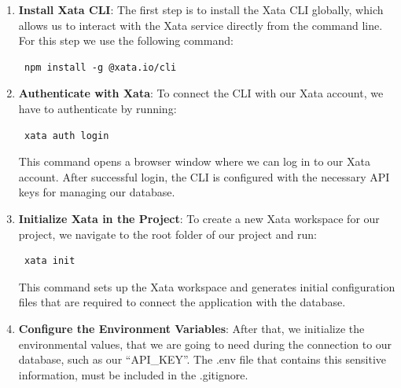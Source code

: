 \begin{enumerate}
    \item \textbf{Install Xata CLI}: The first step is to install the Xata CLI globally, which allows us to interact with the Xata service directly from the command line. For this step we use the following command:
    \begin{verbatim} npm install -g @xata.io/cli \end{verbatim}
    \item \textbf{Authenticate with Xata}: To connect the CLI with our Xata account, we have to authenticate by running: \begin{verbatim} xata auth login \end{verbatim}
    This command opens a browser window where we can log in to our Xata account. After successful login, the CLI is configured with the necessary API keys for managing our database.
    \item \textbf{Initialize Xata in the Project}: To create a new Xata workspace for our project, we navigate to the root folder of our project and run: \begin{verbatim} xata init \end{verbatim}
    This command sets up the Xata workspace and generates initial configuration files that are required to connect the application with the database.
    \item \textbf{Configure the Environment Variables}:  After that, we initialize the environmental values, that we are going to need during the connection to our database, such as our ``API\_KEY''. The .env file that contains this sensitive information, must be included in the .gitignore.
\end{enumerate}

